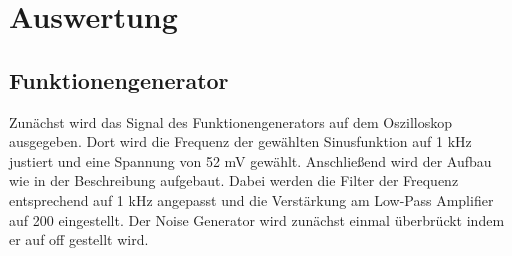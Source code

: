 \section{Auswertung}
\label{sec:Auswertung}
\subsection{Funktionengenerator}
Zunächst wird das Signal des Funktionengenerators auf dem Oszilloskop ausgegeben. Dort wird die Frequenz der gewählten Sinusfunktion auf 1 kHz justiert und eine Spannung von 52 mV gewählt. Anschließend wird der Aufbau wie in der Beschreibung aufgebaut. Dabei werden die Filter der Frequenz entsprechend auf 1 kHz angepasst und die Verstärkung am Low-Pass Amplifier auf 200 eingestellt. Der Noise Generator wird zunächst einmal überbrückt indem er auf off gestellt wird.
